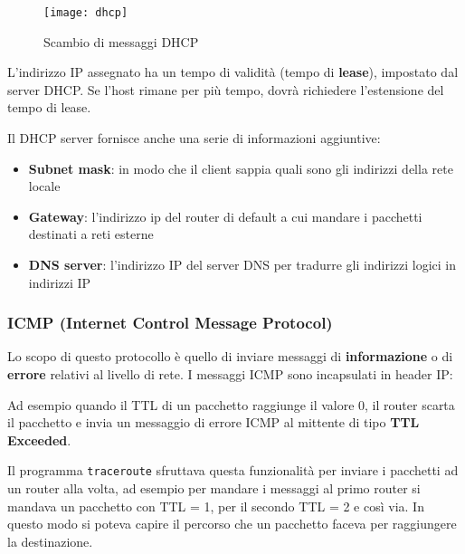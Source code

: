 \documentclass[a4paper]{article}
\begin{document}
\begin{figure}[H]
  \centering
  \texttt{[image: dhcp]}
  \caption{Scambio di messaggi DHCP}
\end{figure}

\noindent
L'indirizzo IP assegnato ha un tempo di validità (tempo di \textbf{lease}), impostato 
dal server DHCP. Se l'host rimane per più tempo, dovrà richiedere l'estensione del
tempo di lease.

\vspace{1em}
\noindent
Il DHCP server fornisce anche una serie di informazioni aggiuntive:
\begin{itemize}
  \item \textbf{Subnet mask}: in modo che il client sappia quali sono gli indirizzi
    della rete locale
  \item \textbf{Gateway}: l'indirizzo ip del router di default a cui mandare i pacchetti
    destinati a reti esterne
  \item \textbf{DNS server}: l'indirizzo IP del server DNS per tradurre gli indirizzi
    logici in indirizzi IP
\end{itemize}

\subsubsection{ICMP (Internet Control Message Protocol)}
Lo scopo di questo protocollo è quello di inviare messaggi di \textbf{informazione} o di
\textbf{errore} relativi al livello di rete. I messaggi ICMP sono incapsulati in header
IP:
\label{27-11-D1}

\begin{example}
  Ad esempio quando il TTL di un pacchetto raggiunge il valore 0, il router scarta il
  pacchetto e invia un messaggio di errore ICMP al mittente di tipo \textbf{TTL Exceeded}.
  \label{27-11-D2}

  \noindent
  Il programma \texttt{traceroute} sfruttava questa funzionalità per inviare i pacchetti
  ad un router alla volta, ad esempio per mandare i messaggi al primo router si mandava
  un pacchetto con TTL = 1, per il secondo TTL = 2 e così via. In questo modo si poteva
  capire il percorso che un pacchetto faceva per raggiungere la destinazione.
\end{example}
\end{document}
